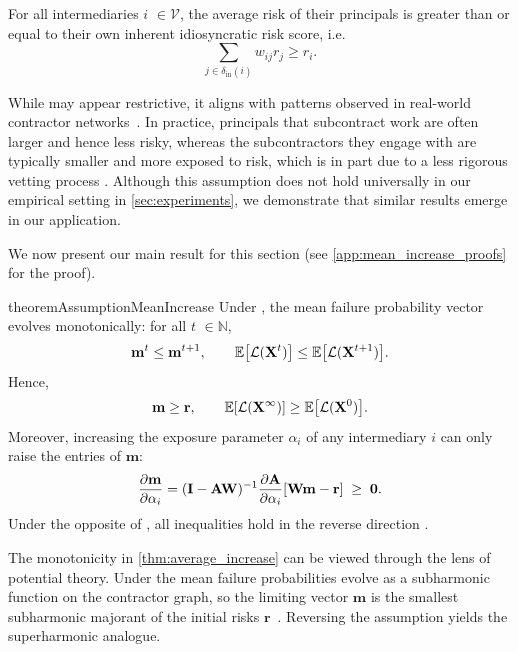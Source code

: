 \documentclass[mnsc,nonblindrev]{informs3}
\newcommand{\Exp}[1]{\mathbb E \left[ #1 \right]} %
\newcommand{\din}{\delta_{\text{in}}}
\newcommand{\GAR}{\mathcal{L}}
\newcommand{\Xvec}{\mathbf{X}}
\newcommand{\rvec}{\mathbf{r}}
\newcommand{\A}{\mathbf{A}}
\newcommand{\W}{\mathbf{W}}
\newcommand{\I}{\mathbf{I}}
\newcommand{\mean}{m}
\newcommand{\meanvec}{\mathbf{\mean}}
\let\originalleft\left
\let\originalright\right
\renewcommand{\left}{\mathopen{}\mathclose\bgroup\originalleft}
\renewcommand{\right}{\aftergroup\egroup\originalright}
\begin{document}
\begin{assumption}
\label{ass:larger_neighbors}
    For all intermediaries $i$ \( \in \mathcal{V}\), the average risk of their principals is greater than or equal to their own inherent idiosyncratic risk score, i.e.
    \[
    \sum_{j \in \din(i)} w_{ij} r_j \geq r_i.
    \]
\end{assumption}

While  may appear restrictive, it aligns with patterns observed in real-world contractor networks~\citep{bci2021supplychain}. In practice, principals that subcontract work are often larger and hence less risky, whereas the subcontractors they engage with are typically smaller and more exposed to risk, which is in part due to a less rigorous vetting process \citep{dietz2018mitigating}.  Although this assumption does not hold universally in our empirical setting in \cref{sec:experiments}, we demonstrate that similar results emerge in our application.

We now present our main result for this section (see \cref{app:mean_increase_proofs} for the proof).




\begin{restatable}{theorem}{AssumptionMeanIncrease}
\label{thm:average_increase}
Under , the mean failure probability vector evolves monotonically: for all \(t\) \( \in \mathbb{N}\),
\[
    \meanvec^t \leq \meanvec^{t+1}, 
    \qquad 
    \Exp{\GAR(\Xvec^t)} \leq \Exp{\GAR(\Xvec^{t+1})}.
\]
Hence,
\[
    \meanvec \geq \rvec, 
    \qquad 
    \Exp{\GAR(\Xvec^\infty)} \geq \Exp{\GAR(\Xvec^0)}.
\]
Moreover, increasing the exposure parameter \(\alpha_i\) of any intermediary \(i\) can only raise the entries of \(\meanvec\):
\[
    \frac{\partial \meanvec}{\partial \alpha_i}
    = (\I-\A\W)^{-1} \frac{\partial \A}{\partial \alpha_i} \left[ \W\meanvec - \rvec \right]
    \;\geq\; \mathbf{0}.
\]
Under the opposite of , all inequalities hold in the reverse direction .
\end{restatable}
\begin{remark}
The monotonicity in \cref{thm:average_increase} can be viewed through the lens of potential theory.  Under  the mean failure probabilities evolve as a subharmonic function on the contractor graph, so the limiting vector $\meanvec$ is the smallest subharmonic majorant of the initial risks $\rvec$~\citep{chung1997spectral}. Reversing the assumption yields the superharmonic analogue.
\end{remark}
\end{document}
